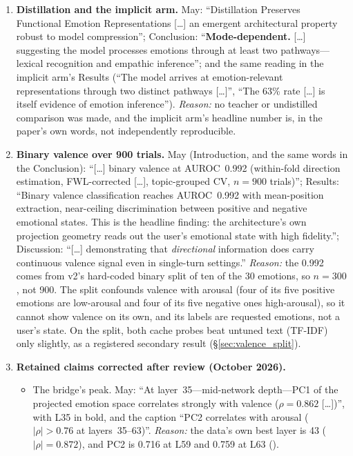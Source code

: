 \begin{enumerate}[leftmargin=*]
    \item \label{app:item:implicit}\textbf{Distillation and the implicit arm.} May: ``Distillation Preserves Functional Emotion Representations [\ldots] an emergent architectural property robust to model compression''; Conclusion: ``\textbf{Mode-dependent.} [\ldots] suggesting the model processes emotions through at least two pathways---lexical recognition and empathic inference''; and the same reading in the implicit arm's Results (``The model arrives at emotion-relevant representations through two distinct pathways [\ldots]'', ``The 63\% rate [\ldots] is itself evidence of emotion inference''). \emph{Reason:} no teacher or undistilled comparison was made, and the implicit arm's headline number is, in the paper's own words, not independently reproducible.
    \item \label{app:item:binary}\textbf{Binary valence over 900 trials.} May (Introduction, and the same words in the Conclusion): ``[\ldots] binary valence at AUROC~0.992 (within-fold direction estimation, FWL-corrected [\ldots], topic-grouped CV, $n = 900$ trials)''; Results: ``Binary valence classification reaches AUROC~0.992 with mean-position extraction, near-ceiling discrimination between positive and negative emotional states. This is the headline finding: the architecture's own projection geometry reads out the user's emotional state with high fidelity.''; Discussion: ``[\ldots] demonstrating that \emph{directional} information does carry continuous valence signal even in single-turn settings.'' \emph{Reason:} the 0.992 comes from v2's hard-coded binary split of ten of the 30 emotions, so $n = 300$, not 900. The split confounds valence with arousal (four of its five positive emotions are low-arousal and four of its five negative ones high-arousal), so it cannot show valence on its own, and its labels are requested emotions, not a user's state. On the split, both cache probes beat untuned text (TF-IDF) only slightly, as a registered secondary result (\S\ref{sec:valence_split}).
    \item \label{app:item:retained}\textbf{Retained claims corrected after review (October 2026).}
    \begin{itemize}[nosep]
        \item The bridge's peak. May: ``At layer~35---mid-network depth---PC1 of the projected emotion space correlates strongly with valence ($\rho = 0.862$ [\ldots])'', with L35 in bold, and the caption ``PC2 correlates with arousal ($|\rho| > 0.76$ at layers~35--63)''. \emph{Reason:} the data's own best layer is 43 ($|\rho| = 0.872$), and PC2 is 0.716 at L59 and 0.759 at L63 ().

\end{itemize}
\end{enumerate}

